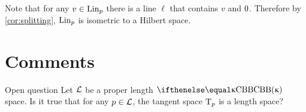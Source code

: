 Note that for any $v\in\Lin_p$ there is a line $\ell$ that contains $v$ and $0$.  Therefore by \ref{cor:splitting}, $\mathop{\rm Lin}\nolimits_p$ is isometric to a Hilbert space.
\qeds




\section{Comments}

\begin{thm}{Open question}\label{open:Halb-proper}
Let $\mathcal{L}$ be a proper length $\Alex\kappa$ space.
Is it true that for any $p\in \spc{L}$, the tangent space $\text{\rm T}_p$ is a length space?
\end{thm}



